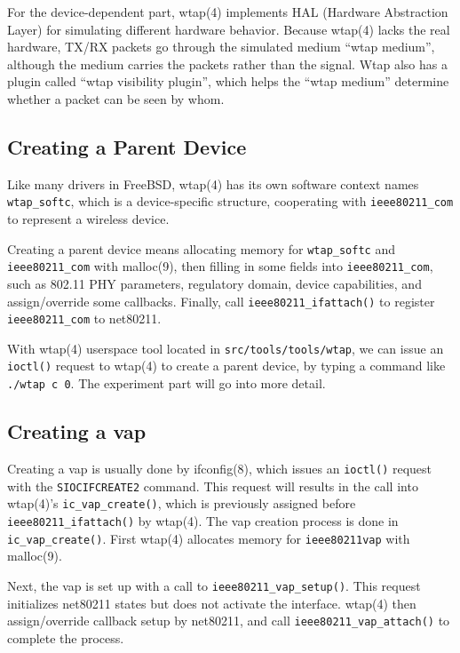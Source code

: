\documentclass[conference]{IEEEtran}
\begin{document}
For the device-dependent part, wtap(4) implements HAL (Hardware Abstraction Layer) for simulating different hardware behavior. Because wtap(4) lacks the real hardware, TX/RX packets go through the simulated medium “wtap medium”, although the medium carries the packets rather than the signal. Wtap also has a plugin called “wtap visibility plugin”, which helps the “wtap medium” determine whether a packet can be seen by whom.

\subsection{Creating a Parent Device}
Like many drivers in FreeBSD, wtap(4) has its own software context names \lstinline{wtap_softc}, which is a device-specific structure, cooperating with \lstinline{ieee80211_com} to represent a wireless device.

Creating a parent device means allocating memory for \lstinline{wtap_softc} and \lstinline{ieee80211_com} with malloc(9), then filling in some fields into \lstinline{ieee80211_com}, such as 802.11 PHY parameters, regulatory domain, device capabilities, and assign/override some callbacks. Finally, call \lstinline{ieee80211_ifattach()} to register \lstinline{ieee80211_com} to net80211.

With wtap(4) userspace tool located in \lstinline{src/tools/tools/wtap}, we can issue an \lstinline{ioctl()} request to wtap(4) to create a parent device, by typing a command like \lstinline{./wtap c 0}. The experiment part will go into more detail.

\subsection{Creating a vap}
Creating a vap is usually done by ifconfig(8), which issues an \lstinline{ioctl()} request with the \lstinline{SIOCIFCREATE2} command. This request will results in the call into wtap(4)'s \lstinline{ic_vap_create()}, which is previously assigned before \lstinline{ieee80211_ifattach()} by wtap(4).
The vap creation process is done in \lstinline{ic_vap_create()}. First wtap(4) allocates memory for \lstinline{ieee80211vap} with malloc(9). 

Next, the vap is set up with a call to \lstinline{ieee80211_vap_setup()}. This request initializes net80211 states but does not activate the interface. wtap(4) then assign/override callback setup by net80211, and call \lstinline{ieee80211_vap_attach()} to complete the process.
\end{document}
